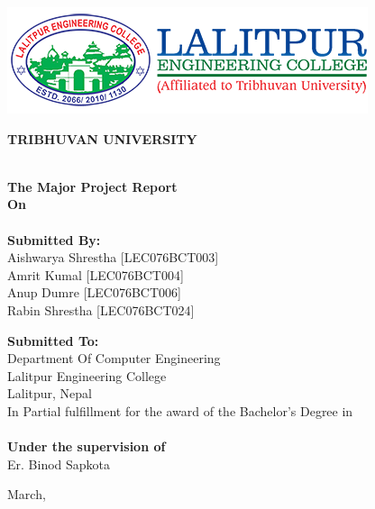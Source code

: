 \thispagestyle{empty}
\begin{center}
\begin{spacing}{1.5}

\includegraphics[scale=0.8]{img/Graphics/leclogo21.png}

\vspace{10pt}
\textbf{
\large{TRIBHUVAN UNIVERSITY}\\
\MakeUppercase{\large{\theinstitute}}\\
\MakeUppercase{\large{\thecampus}}}

\vspace{10pt}

\textbf{The 
Major Project Report\\
On}\\
\textbf{\thetitle}\\
\vspace{20pt} 
\textbf{Submitted By:} \\ 
 
Aishwarya Shrestha [LEC076BCT003]\\
Amrit Kumal        [LEC076BCT004]\\
Anup Dumre         [LEC076BCT006]\\
Rabin Shrestha     [LEC076BCT024]\\   
 
 
 \vspace{20pt}

\textbf{Submitted To:}\\
Department Of Computer Engineering\\
Lalitpur Engineering College\\
Lalitpur, Nepal\\



\vspace{10pt} 
In Partial fulfillment for the award of the  Bachelor’s Degree in\\
\theDegree\\
\vspace{10pt}
\textbf{Under the supervision of}\\
Er. Binod Sapkota

\vspace{10pt}

 March, \the\year

\vspace{1cm}


 
\end{spacing}
\end{center}

\clearpage

 